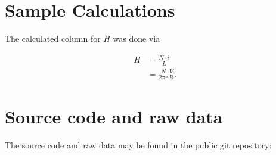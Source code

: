 \section{Sample Calculations}


The calculated column for $H$ was done via

\begin{align*}
    H &= \frac{N \cdot i}{L} \\
    & = \frac{N}{2 \pi r} \frac{V}{R}.
\end{align*}

\section{Source code and raw data}

The source code and raw data may be found in the public git repository:


